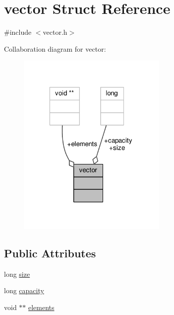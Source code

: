 \hypertarget{structvector}{\section{vector Struct Reference}
\label{structvector}
}


{\ttfamily \#include $<$vector.\-h$>$}



Collaboration diagram for vector\-:
\nopagebreak
\begin{figure}[H]
\begin{center}
\leavevmode
\includegraphics[width=205pt]{structvector__coll__graph}
\end{center}
\end{figure}
\subsection*{Public Attributes}
\begin{DoxyCompactItemize}
\item 
long \hyperlink{structvector_a8889986a7341960ef1671f4d37bdbac7}{size}
\item 
long \hyperlink{structvector_af8408bb11649ee1613d18bbe714ff093}{capacity}
\item 
void $\ast$$\ast$ \hyperlink{structvector_a0936ad81a96d3e9b406b655fd42d3b82}{elements}
\end{DoxyCompactItemize}


